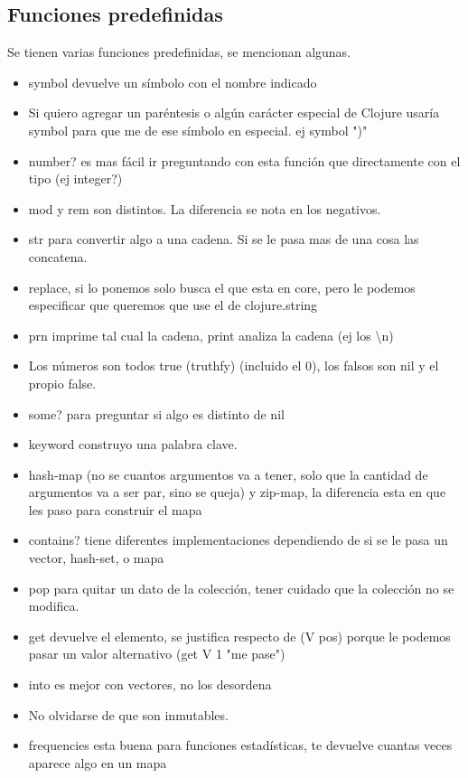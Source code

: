 \subsection*{Funciones predefinidas}
Se tienen varias funciones predefinidas, se mencionan algunas.
\begin{itemize}
\item symbol devuelve un símbolo con el nombre indicado
\item Si quiero agregar un paréntesis o algún carácter especial de Clojure usaría symbol para que me de ese símbolo en especial. ej symbol ")"
\item number? es mas fácil ir preguntando con esta función que directamente con el tipo (ej integer?)
\item mod y rem son distintos. La diferencia se nota en los negativos. %
\item str para convertir algo a una cadena. Si se le pasa mas de una cosa las concatena.
\item replace, si lo ponemos solo busca el que esta en core, pero le podemos especificar que queremos que use el de clojure.string
\item prn imprime tal cual la cadena, print analiza la cadena (ej los \textbackslash n)
\item Los números son todos true (truthfy) (incluido el 0), los falsos son nil y el propio false.
\item some? para preguntar si algo es distinto de nil
\item keyword construyo una palabra clave.
\item hash-map (no se cuantos argumentos va a tener, solo que la cantidad de argumentos va a ser par, sino se queja) y zip-map, la diferencia esta en que les paso para construir el mapa
\item contains? tiene diferentes implementaciones dependiendo de si se le pasa un vector, hash-set, o mapa
\item pop para quitar un dato de la colección, tener cuidado que la colección no se modifica.
\item get devuelve el elemento, se justifica respecto de (V pos) porque le podemos pasar un valor alternativo (get V 1 "me pase")
\item into es mejor con vectores, no los desordena
\item No olvidarse de que son inmutables.
\item frequencies esta buena para funciones estadísticas, te devuelve cuantas veces aparece algo en un mapa

\end{itemize}
